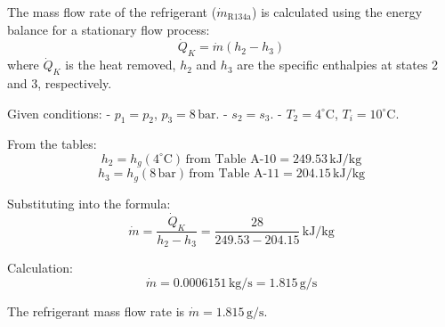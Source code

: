 The mass flow rate of the refrigerant (\( \dot{m}_{\text{R134a}} \)) is calculated using the energy balance for a stationary flow process:  
\[
\dot{Q}_K = \dot{m} (h_2 - h_3)
\]  
where \( \dot{Q}_K \) is the heat removed, \( h_2 \) and \( h_3 \) are the specific enthalpies at states 2 and 3, respectively.

Given conditions:  
- \( p_1 = p_2 \), \( p_3 = 8 \, \text{bar} \).  
- \( s_2 = s_3 \).  
- \( T_2 = 4^\circ\text{C} \), \( T_i = 10^\circ\text{C} \).  

From the tables:  
\[
h_2 = h_g(4^\circ\text{C}) \, \text{from Table A-10} = 249.53 \, \text{kJ/kg}
\]  
\[
h_3 = h_g(8 \, \text{bar}) \, \text{from Table A-11} = 204.15 \, \text{kJ/kg}
\]

Substituting into the formula:  
\[
\dot{m} = \frac{\dot{Q}_K}{h_2 - h_3} = \frac{28}{249.53 - 204.15} \, \text{kJ/kg}
\]

Calculation:  
\[
\dot{m} = 0.0006151 \, \text{kg/s} = 1.815 \, \text{g/s}
\]  

The refrigerant mass flow rate is \( \dot{m} = 1.815 \, \text{g/s} \).